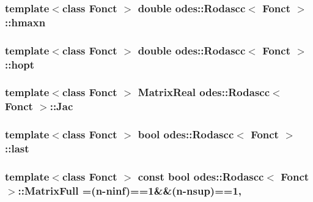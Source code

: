 \hypertarget{classodes_1_1Rodascc_a8204edc4e705fb892340dc565b9e3f1c}{
\subsubsection[{hmaxn}]{\setlength{\rightskip}{0pt plus 5cm}template$<$class Fonct $>$ double {\bf odes\-::\-Rodascc}$<$ Fonct $>$\-::hmaxn\hspace{0.3cm}{\ttfamily [private]}}}\label{classodes_1_1Rodascc_a8204edc4e705fb892340dc565b9e3f1c}
\hypertarget{classodes_1_1Rodascc_ade956e8347345ab8fbe4ca6d477e7add}{
\subsubsection[{hopt}]{\setlength{\rightskip}{0pt plus 5cm}template$<$class Fonct $>$ double {\bf odes\-::\-Rodascc}$<$ Fonct $>$\-::hopt\hspace{0.3cm}{\ttfamily [private]}}}\label{classodes_1_1Rodascc_ade956e8347345ab8fbe4ca6d477e7add}
\hypertarget{classodes_1_1Rodascc_af07528efa60ce583012e64ce98b9a404}{
\subsubsection[{Jac}]{\setlength{\rightskip}{0pt plus 5cm}template$<$class Fonct $>$ {\bf Matrix\-Real} {\bf odes\-::\-Rodascc}$<$ Fonct $>$\-::Jac\hspace{0.3cm}{\ttfamily [private]}}}\label{classodes_1_1Rodascc_af07528efa60ce583012e64ce98b9a404}
\hypertarget{classodes_1_1Rodascc_a921d65fad3a28e2609348203aaa39ec8}{
\subsubsection[{last}]{\setlength{\rightskip}{0pt plus 5cm}template$<$class Fonct $>$ bool {\bf odes\-::\-Rodascc}$<$ Fonct $>$\-::last\hspace{0.3cm}{\ttfamily [private]}}}\label{classodes_1_1Rodascc_a921d65fad3a28e2609348203aaa39ec8}
\hypertarget{classodes_1_1Rodascc_a6fb3605e3784360a5cc4519dbb72464e}{
\subsubsection[{Matrix\-Full}]{\setlength{\rightskip}{0pt plus 5cm}template$<$class Fonct $>$ const bool {\bf odes\-::\-Rodascc}$<$ Fonct $>$\-::Matrix\-Full =({\bf n}-\/{\bf ninf})==1\&\&({\bf n}-\/{\bf nsup})==1\hspace{0.3cm}{\ttfamily [static]}, {\ttfamily [private]}}}\label{classodes_1_1Rodascc_a6fb3605e3784360a5cc4519dbb72464e}
